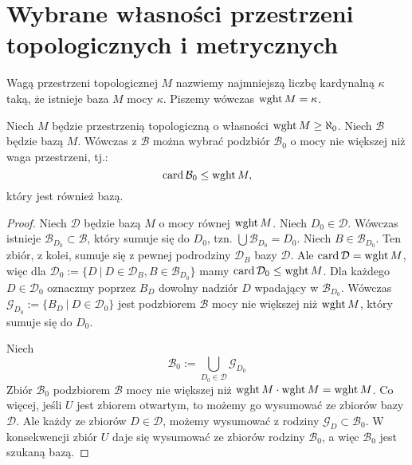 \section{Wybrane własności przestrzeni topologicznych i metrycznych}

\begin{df}
  Wagą przestrzeni topologicznej $M$ nazwiemy najmniejszą liczbę kardynalną $\kappa$ taką, że istnieje baza $M$ mocy $\kappa$. Piszemy wówczas $\operatorname{wght} M = \kappa$.
\end{df}

\begin{lem} \label{lem:base-small}
  Niech $M$ będzie przestrzenią topologiczną o własności $\operatorname{wght} M \geq \aleph_0$. Niech $\mathcal B$ będzie bazą $M$. Wówczas z $\mathcal B$ można wybrać podzbiór $\mathcal B_0$ o mocy nie większej niż waga przestrzeni, tj.:
  \[
    \operatorname{card} \mathcal B_0 \leq \operatorname{wght} M,
  \]
  który jest również bazą.
  \begin{proof}
    Niech $\mathcal D$ będzie bazą $M$ o mocy równej $\operatorname{wght} M$. Niech $D_0 \in \mathcal D$. Wówczas istnieje $\mathcal B_{D_0} \subset \mathcal B$, który sumuje się do $D_0$, tzn. $\bigcup \mathcal B_{D_0} = D_0$. Niech $B \in \mathcal B_{D_0}$. Ten zbiór, z kolei, sumuje się z pewnej podrodziny $\mathcal D_B$ bazy $\mathcal D$. Ale $\operatorname{card}\mathcal D = \operatorname{wght} M$, więc dla $\mathcal D_0 := \{D\ |\ D \in \mathcal D_B, B \in \mathcal B_{D_0}\}$ mamy $\operatorname{card}\mathcal D_0 \leq \operatorname{wght} M$. Dla każdego $D \in \mathcal D_0$ oznaczmy poprzez $B_D$ dowolny nadziór $D$ wpadający w $\mathcal B_{D_0}$. Wówczas $\mathcal G_{D_0} := \{B_D\ |\ D \in \mathcal D_0\}$ jest podzbiorem $\mathcal B$ mocy nie większej niż $\operatorname{wght} M$, który sumuje się do $D_0$.
    
    Niech
    \[
      \mathcal B_0 := \bigcup_{D_0 \in \mathcal D} \mathcal G_{D_0}
    \]
    Zbiór $\mathcal B_0$ podzbiorem $\mathcal B$ mocy nie większej niż $\operatorname{wght} M \cdot \operatorname{wght} M = \operatorname{wght} M$. Co więcej, jeśli $U$ jest zbiorem otwartym, to możemy go wysumować ze zbiorów bazy $\mathcal D$. Ale każdy ze zbiorów $D \in \mathcal{D}$, możemy wysumować z rodziny $\mathcal G_D \subset \mathcal B_0$. W konsekwencji zbiór $U$ daje się wysumować ze zbiorów rodziny $\mathcal B_0$, a więc $\mathcal B_0$ jest szukaną bazą.
  \end{proof}
\end{lem}

